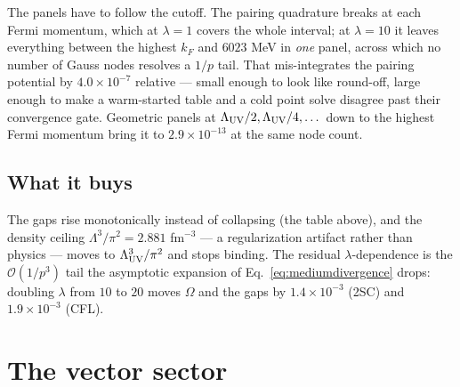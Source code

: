 \documentclass[aps,prc,onecolumn,superscriptaddress,nofootinbib,10pt]{revtex4-2}
\newcommand{\Lam}{\Lambda}
\begin{document}
The panels have to follow the cutoff. The pairing quadrature breaks at each
Fermi momentum, which at $\lambda = 1$ covers the whole interval; at
$\lambda = 10$ it leaves everything between the highest $k_F$ and $6023$ MeV in
\emph{one} panel, across which no number of Gauss nodes resolves a $1/p$ tail.
That mis-integrates the pairing potential by $4.0\times10^{-7}$ relative ---
small enough to look like round-off, large enough to make a warm-started table
and a cold point solve disagree past their convergence gate. Geometric panels
at $\Lam_{\rm UV}/2, \Lam_{\rm UV}/4, \dots$ down to the highest Fermi momentum
bring it to $2.9\times10^{-13}$ at the same node count.

\subsection{What it buys}

The gaps rise monotonically instead of collapsing (the table above), and the
density ceiling $\Lam^3/\pi^2 = 2.881$ fm$^{-3}$ --- a regularization artifact
rather than physics --- moves to $\Lam_{\rm UV}^3/\pi^2$ and stops binding. The
residual $\lambda$-dependence is the $\mathcal{O}(1/p^3)$ tail the asymptotic
expansion of Eq.~\eqref{eq:mediumdivergence} drops: doubling $\lambda$ from
$10$ to $20$ moves $\Omega$ and the gaps by $1.4\times10^{-3}$ (2SC) and
$1.9\times10^{-3}$ (CFL).

\section{The vector sector}
\label{sec:vector}
\end{document}
